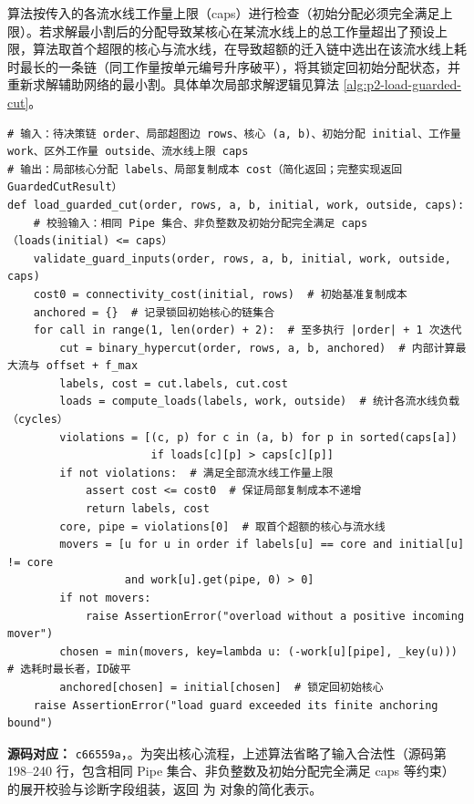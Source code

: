 \documentclass[anonymous,withtoc]{gmcm2026}
\renewcommand{\thealgorithm}{\thesection-\arabic{algorithm}}
\begin{document}
算法按传入的各流水线工作量上限（caps）进行检查（初始分配必须完全满足上限）。若求解最小割后的分配导致某核心在某流水线上的总工作量超出了预设上限，算法取首个超限的核心与流水线，在导致超额的迁入链中选出在该流水线上耗时最长的一条链（同工作量按单元编号升序破平），将其锁定回初始分配状态，并重新求解辅助网络的最小割。具体单次局部求解逻辑见算法 \ref{alg:p2-load-guarded-cut}。

\FloatBarrier
\par{}\begingroup\normalsize
\captionsetup{type=algorithm,position=top,justification=raggedright,singlelinecheck=false,labelfont=bf}
\label{alg:p2-load-guarded-cut}
\nopagebreak
\begin{tcolorbox}[enhanced,breakable,colback=white,colframe=black,
  boxrule=0pt,toprule=.4pt,bottomrule=.4pt,sharp corners,boxsep=0pt,
  left=0pt,right=0pt,top=4pt,bottom=4pt,before skip=2pt,after skip=2pt,
  title after break={算法~\thealgorithm（续）},
  colbacktitle=white,coltitle=black,fonttitle=\normalsize\bfseries]


\begin{lstlisting}[style=paperpseudo]
# 输入：待决策链 order、局部超图边 rows、核心 (a, b)、初始分配 initial、工作量 work、区外工作量 outside、流水线上限 caps
# 输出：局部核心分配 labels、局部复制成本 cost（简化返回；完整实现返回 GuardedCutResult）
def load_guarded_cut(order, rows, a, b, initial, work, outside, caps):
    # 校验输入：相同 Pipe 集合、非负整数及初始分配完全满足 caps（loads(initial) <= caps）
    validate_guard_inputs(order, rows, a, b, initial, work, outside, caps)
    cost0 = connectivity_cost(initial, rows)  # 初始基准复制成本
    anchored = {}  # 记录锁回初始核心的链集合
    for call in range(1, len(order) + 2):  # 至多执行 |order| + 1 次迭代
        cut = binary_hypercut(order, rows, a, b, anchored)  # 内部计算最大流与 offset + f_max
        labels, cost = cut.labels, cut.cost
        loads = compute_loads(labels, work, outside)  # 统计各流水线负载（cycles）
        violations = [(c, p) for c in (a, b) for p in sorted(caps[a])
                      if loads[c][p] > caps[c][p]]
        if not violations:  # 满足全部流水线工作量上限
            assert cost <= cost0  # 保证局部复制成本不递增
            return labels, cost
        core, pipe = violations[0]  # 取首个超额的核心与流水线
        movers = [u for u in order if labels[u] == core and initial[u] != core
                  and work[u].get(pipe, 0) > 0]
        if not movers:
            raise AssertionError("overload without a positive incoming mover")
        chosen = min(movers, key=lambda u: (-work[u][pipe], _key(u)))  # 选耗时最长者，ID破平
        anchored[chosen] = initial[chosen]  # 锁定回初始核心
    raise AssertionError("load guard exceeded its finite anchoring bound")
\end{lstlisting}
\textbf{源码对应：} \texttt{c66559a}，\texttt{}。为突出核心流程，上述算法省略了输入合法性（源码第 198--240 行，包含相同 Pipe 集合、非负整数及初始分配完全满足 caps 等约束）的展开校验与诊断字段组装，返回 \texttt{} 为 \texttt{} 对象的简化表示。


\end{tcolorbox}
\end{document}
